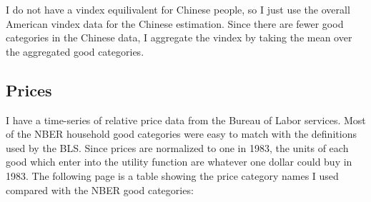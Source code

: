 \documentclass[12pt]{article}
\begin{document}
I do not have a vindex equilivalent for Chinese people, so I just use the overall American vindex data for the Chinese estimation. Since there are fewer good categories in the Chinese data, I aggregate the vindex by taking the mean over the aggregated good categories. 
\subsection{Prices}
I have a time-series of relative price data from the Bureau of Labor services.
Most of the NBER household good categories were easy to match with the definitions used by the BLS.   
Since prices are normalized to one in 1983, the units of each good which enter into the utility function are whatever one dollar could buy in 1983.
The following page is a table showing the price category names I used compared with the NBER good categories:
\end{document}
